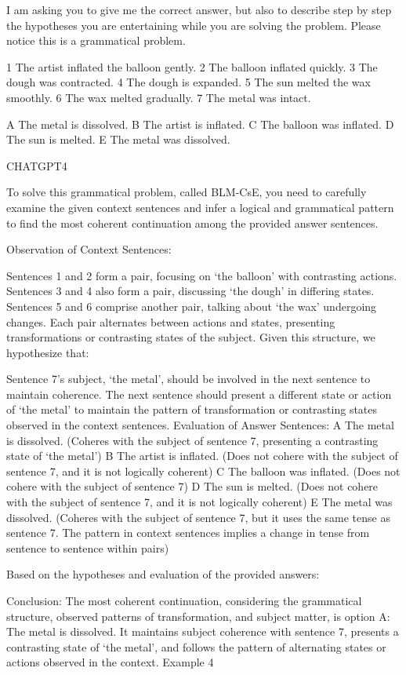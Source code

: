 I am asking you to give me the correct answer, but also to describe step by step  the hypotheses you are entertaining while you are solving the problem. Please notice this is a grammatical problem.


1 The artist inflated the balloon gently.
2 The balloon inflated quickly.
3 The dough was contracted.
4 The dough is expanded.
5 The sun melted the wax smoothly.
6 The wax melted gradually.
7 The metal was intact.

A The metal is dissolved.
B The artist is inflated.
C The balloon was inflated.
D The sun is melted.
E The metal was dissolved.

CHATGPT4

To solve this grammatical problem, called BLM-CsE, you need to carefully examine the given context sentences and infer a logical and grammatical pattern to find the most coherent continuation among the provided answer sentences.

Observation of Context Sentences:

Sentences 1 and 2 form a pair, focusing on ‘the balloon’ with contrasting actions.
Sentences 3 and 4 also form a pair, discussing ‘the dough’ in differing states.
Sentences 5 and 6 comprise another pair, talking about ‘the wax’ undergoing changes.
Each pair alternates between actions and states, presenting transformations or contrasting states of the subject.
Given this structure, we hypothesize that:

Sentence 7's subject, ‘the metal’, should be involved in the next sentence to maintain coherence.
The next sentence should present a different state or action of ‘the metal’ to maintain the pattern of transformation or contrasting states observed in the context sentences.
Evaluation of Answer Sentences:
A The metal is dissolved. (Coheres with the subject of sentence 7, presenting a contrasting state of ‘the metal’)
B The artist is inflated. (Does not cohere with the subject of sentence 7, and it is not logically coherent)
C The balloon was inflated. (Does not cohere with the subject of sentence 7)
D The sun is melted. (Does not cohere with the subject of sentence 7, and it is not logically coherent)
E The metal was dissolved. (Coheres with the subject of sentence 7, but it uses the same tense as sentence 7. The pattern in context sentences implies a change in tense from sentence to sentence within pairs)

Based on the hypotheses and evaluation of the provided answers:

Conclusion:
The most coherent continuation, considering the grammatical structure, observed patterns of transformation, and subject matter, is option A: The metal is dissolved. It maintains subject coherence with sentence 7, presents a contrasting state of ‘the metal’, and follows the pattern of alternating states or actions observed in the context.
Example 4

